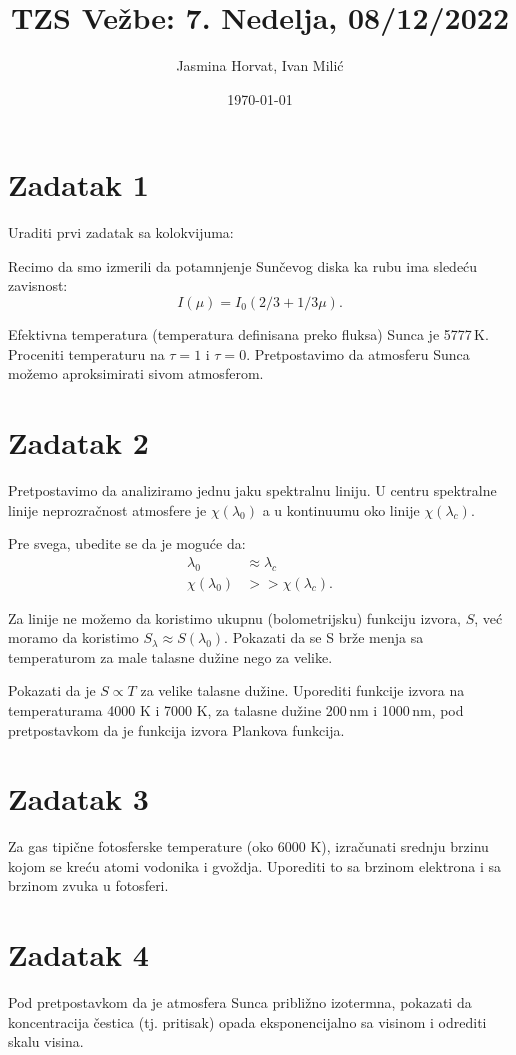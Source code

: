 \documentclass[12pt]{article}
\title{TZS Ve\v{z}be: 7. Nedelja, 08/12/2022}
\author{Jasmina Horvat, Ivan Mili\'{c}}
\date{\today}
\begin{document}
\maketitle

\section{Zadatak 1}
Uraditi prvi zadatak sa kolokvijuma:

Recimo da smo izmerili da potamnjenje Sun\v{c}evog diska ka rubu ima slede\'{c}u zavisnost: 
$$I(\mu) = I_0(2/3 + 1/3 \mu).$$ 

Efektivna temperatura (temperatura definisana preko fluksa) Sunca je 5777\,K. Proceniti temperaturu na $\tau=1$ i $\tau=0$. Pretpostavimo da atmosferu Sunca mo\v{z}emo aproksimirati sivom atmosferom.

\section{Zadatak 2}
Pretpostavimo da analiziramo jednu jaku spektralnu liniju. U centru spektralne linije neprozra\v{c}nost atmosfere je $\chi(\lambda_0)$ a u kontinuumu oko linije $\chi(\lambda_c)$. 

Pre svega, ubedite se da je mogu\'{c}e da:
\begin{align}
\lambda_0 &\approx \lambda_c \nonumber \\
\chi(\lambda_0)  &>> \chi(\lambda_c).
\end{align}

Za linije ne mo\v{z}emo da koristimo ukupnu (bolometrijsku) funkciju izvora, $S$, ve\'{c} moramo da koristimo $S_\lambda \approx S(\lambda_0)$. Pokazati da se S br\v{z}e menja sa temperaturom za male talasne du\v{z}ine nego za velike. 

Pokazati da je $S\propto T$ za velike talasne du\v{z}ine. Uporediti funkcije izvora na temperaturama 4000 K i 7000 K, za talasne du\v{z}ine 200\,nm i 1000\,nm, pod pretpostavkom da je funkcija izvora Plankova funkcija.

\section{Zadatak 3}
Za gas tipi\v{c}ne fotosferske temperature (oko 6000 K), izra\v{c}unati srednju brzinu kojom se kre\'{c}u atomi vodonika i gvo\v{z}dja. Uporediti to sa brzinom elektrona i sa brzinom zvuka u fotosferi.

\section{Zadatak 4}
Pod pretpostavkom da je atmosfera Sunca pribli\v{z}no izotermna, pokazati da koncentracija \v{c}estica (tj. pritisak) opada eksponencijalno sa visinom i odrediti skalu visina. 
\end{document}
